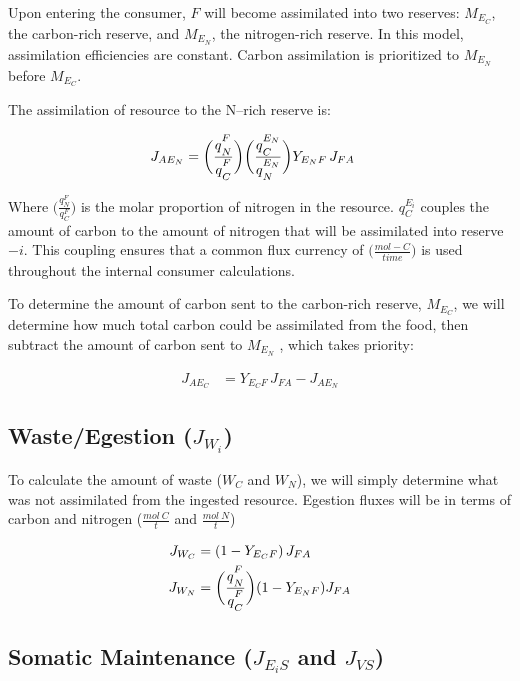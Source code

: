 \documentclass[
]{article}
\begin{document}
Upon entering the consumer, \(F\) will become assimilated into two
reserves: \(M_{E_C}\), the carbon-rich reserve, and \(M_{E_N}\), the
nitrogen-rich reserve. In this model, assimilation efficiencies are
constant. Carbon assimilation is prioritized to \(M_{E_N}\) before
\(M_{E_C}\).

The assimilation of resource to the N--rich reserve is:

\begin{align}
J_{A{E_N}} &= \biggl(\frac{q\strut_{N}^{F}}{q\strut_{C}^{F}}\biggr)\biggl(\frac{q\strut_{C}^{E_N}}{q\strut_{N}^{E_N}}\biggr)Y_{{E_N}F}\,J_{FA}
\end{align}

Where \(\biggl(\frac{q_{N}^{F}}{q_{C}^{F}}\biggr)\) is the molar
proportion of nitrogen in the resource. \({q_{C}^{E_i}}\) couples the
amount of carbon to the amount of nitrogen that will be assimilated into
reserve\(-i\). This coupling ensures that a common flux currency of
\(\biggl(\frac{mol-C}{time}\biggr)\) is used throughout the internal
consumer calculations.

To determine the amount of carbon sent to the carbon-rich reserve,
\(M_{E_C}\), we will determine how much total carbon could be
assimilated from the food, then subtract the amount of carbon sent to
\(M_{E_N}\) , which takes priority:

\begin{align}
J_{A{E_C}} &= Y_{{E_C}F}\,J_{FA} - J_{A{E_N}}
\end{align}

\subsection{\texorpdfstring{Waste/Egestion
(\(J_{W_i}\))}{Waste/Egestion (J\_\{W\_i\})}}\label{wasteegestion-j_w_i}

To calculate the amount of waste (\(W_C\) and \(W_N\)), we will simply
determine what was not assimilated from the ingested resource. Egestion
fluxes will be in terms of carbon and nitrogen (\(\frac{mol\:C}{t}\) and
\(\frac{mol\:N}{t}\))

\begin{align}
J_{W_C} &= (1-Y_{{E_C}F})\,J_{FA}
\\
J_{W_N} &= \biggl(\frac{q\strut_{N}^{F}}{q\strut_{C}^{F}}\biggr)(1 - Y_{{E_N}F})J_{FA}
\end{align}

\newpage

\subsection{\texorpdfstring{Somatic Maintenance (\(J_{E_{i}S}\) and
\(J_{VS}\))}{Somatic Maintenance (J\_\{E\_\{i\}S\} and J\_\{VS\})}}\label{somatic-maintenance-j_e_is-and-j_vs}
\end{document}
